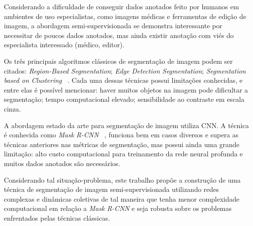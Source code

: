 Considerando a dificuldade de conseguir dados anotados feito por
humanos em ambientes de uso especialistas, como imagens médicas e
ferramentas de edição de imagem, a abordagem semi-supervisionada se
demonstra interessante por necessitar de poucos dados anotados, mas ainda
existir anotação com viés do especialista interessado (médico,
editor).

Os três principais algoritmos clássicos de segmentação de imagem podem
ser citados: \textit{Region-Based Segmentation}; \textit{Edge Detection
  Segmentation}; \textit{Segmentation based on Clustering}
~\cite{ImageSegmentationTechniques1985}. Cada uma dessas técnicas
possui limitações conhecidas, e entre elas é possível mencionar: haver
muitos objetos na imagem pode dificultar a segmentação; tempo
computacional elevado; sensibilidade ao contraste em escala cinza.

A abordagem estado da arte para segmentação de imagem utiliza
\gls{CNN}. A técnica é conhecida como \textit{Mask R-CNN}
~\cite{he2018mask}, funciona bem em casos diversos e supera as técnicas
anteriores nas métricas de segmentação, mas possui ainda uma grande
limitação: alto custo computacional para treinamento da rede neural
profunda e muitos dados anotados são necessários.

Considerando tal situação-problema, este trabalho propõe a construção
de uma técnica de segmentação de imagem semi-supervisionada utilizando
redes complexas e dinâmicas coletivas de tal maneira que tenha menor
complexidade computacional em relação a \textit{Mask R-CNN} e seja
robusta sobre os problemas enfrentados pelas técnicas clássicas.
